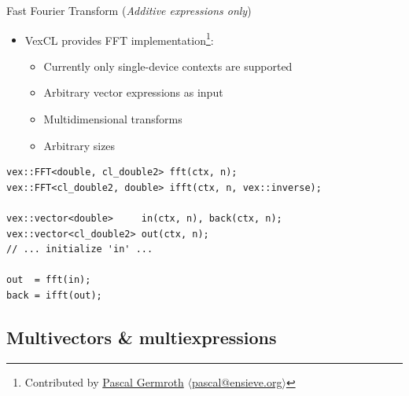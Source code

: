 \documentclass[@BEAMER_OPTIONS@]{beamer}
\newcommand{\additive}{\hspace{1cm}\footnotesize(\emph{Additive expressions only})}
\begin{document}
\begin{frame}[fragile]{Fast Fourier Transform \additive}
    \begin{itemize}
        \item VexCL provides FFT implementation\footnote{Contributed by
            \href{https://github.com/neapel}{Pascal Germroth}
            $\langle$\href{mailto:pascal@ensieve.org}{pascal@ensieve.org}$\rangle$}:
            \begin{itemize}
                \item Currently only single-device contexts are supported
                \item Arbitrary vector expressions as input
                \item Multidimensional transforms
                \item Arbitrary sizes
            \end{itemize}
    \end{itemize}
    \begin{exampleblock}{}
        \begin{lstlisting}
vex::FFT<double, cl_double2> fft(ctx, n);
vex::FFT<cl_double2, double> ifft(ctx, n, vex::inverse);

vex::vector<double>     in(ctx, n), back(ctx, n);
vex::vector<cl_double2> out(ctx, n);
// ... initialize 'in' ...

out  = fft(in);
back = ifft(out);
        \end{lstlisting}
    \end{exampleblock}
\end{frame}

\note{
}

\subsection{Multivectors \& multiexpressions}
\end{document}
